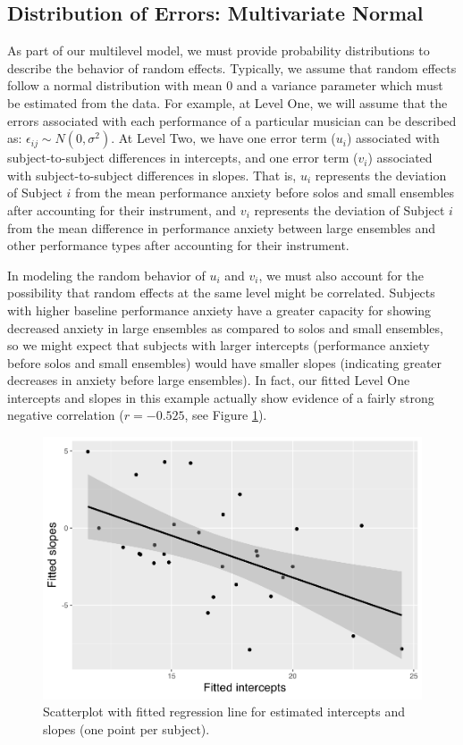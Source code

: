 \documentclass[
]{krantz}
\begin{document}
\hypertarget{MVN}{%
\subsection{Distribution of Errors: Multivariate Normal}\label{MVN}}

As part of our multilevel model, we must provide probability distributions to describe the behavior of random effects. Typically, we assume that random effects follow a normal distribution with mean 0 and a variance parameter which must be estimated from the data. For example, at Level One, we will assume that the errors associated with each performance of a particular musician can be described as: \(\epsilon_{ij}\sim N(0,\sigma^2)\). At Level Two, we have one error term (\(u_{i}\)) associated with subject-to-subject differences in intercepts, and one error term (\(v_{i}\)) associated with subject-to-subject differences in slopes. That is, \(u_{i}\) represents the deviation of Subject \(i\) from the mean performance anxiety before solos and small ensembles after accounting for their instrument, and \(v_{i}\) represents the deviation of Subject \(i\) from the mean difference in performance anxiety between large ensembles and other performance types after accounting for their instrument.

In modeling the random behavior of \(u_{i}\) and \(v_{i}\), we must also account for the possibility that random effects at the same level might be correlated. Subjects with higher baseline performance anxiety have a greater capacity for showing decreased anxiety in large ensembles as compared to solos and small ensembles, so we might expect that subjects with larger intercepts (performance anxiety before solos and small ensembles) would have smaller slopes (indicating greater decreases in anxiety before large ensembles). In fact, our fitted Level One intercepts and slopes in this example actually show evidence of a fairly strong negative correlation (\(r=-0.525\), see Figure \ref{fig:mli-scat1}).

\begin{figure}

{\centering \includegraphics[width=0.6\linewidth]{bookdown-BeyondMLR_files/figure-latex/mli-scat1-1} 

}

\caption{Scatterplot with fitted regression line for estimated intercepts and slopes (one point per subject).}\label{fig:mli-scat1}
\end{figure}
\end{document}

